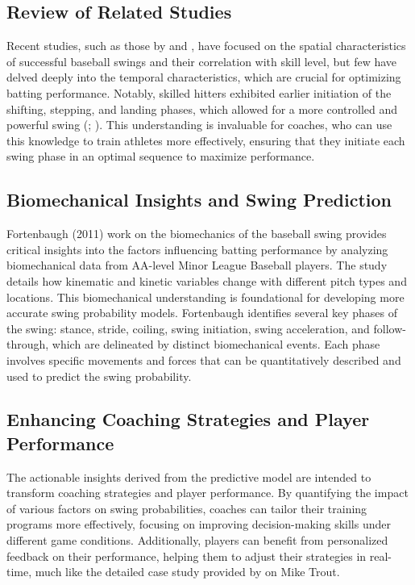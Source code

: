 \documentclass[12pt]{article}
\begin{document}
\subsection*{Review of Related Studies}
Recent studies, such as those by \cite{DeRenne2007} and \cite{Escamilla2009a}, have focused on the spatial characteristics of successful baseball swings and their correlation with skill level, but few have delved deeply into the temporal characteristics, which are crucial for optimizing batting performance. Notably, skilled hitters exhibited earlier initiation of the shifting, stepping, and landing phases, which allowed for a more controlled and powerful swing (\cite{Nakata2013}; \cite{Escamilla2009a}). This understanding is invaluable for coaches, who can use this knowledge to train athletes more effectively, ensuring that they initiate each swing phase in an optimal sequence to maximize performance.

\subsection{Biomechanical Insights and Swing Prediction}
Fortenbaugh (2011) work on the biomechanics of the baseball swing provides critical insights into the factors influencing batting performance by analyzing biomechanical data from AA-level Minor League Baseball players. The study details how kinematic and kinetic variables change with different pitch types and locations. This biomechanical understanding is foundational for developing more accurate swing probability models. Fortenbaugh identifies several key phases of the swing: stance, stride, coiling, swing initiation, swing acceleration, and follow-through, which are delineated by distinct biomechanical events. Each phase involves specific movements and forces that can be quantitatively described and used to predict the swing probability.

\subsection*{Enhancing Coaching Strategies and Player Performance}
The actionable insights derived from the predictive model are intended to transform coaching strategies and player performance. By quantifying the impact of various factors on swing probabilities, coaches can tailor their training programs more effectively, focusing on improving decision-making skills under different game conditions. Additionally, players can benefit from personalized feedback on their performance, helping them to adjust their strategies in real-time, much like the detailed case study provided by \cite{Deshpande2023} on Mike Trout.
\end{document}

